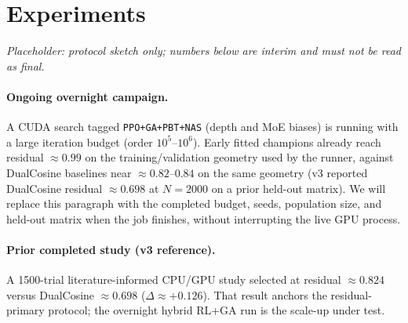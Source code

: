 \section{Experiments}
\label{sec:experiments}

\textit{Placeholder: protocol sketch only; numbers below are interim and must not be read as final.}

\paragraph{Ongoing overnight campaign.}
A CUDA search tagged \texttt{PPO+GA+PBT+NAS} (depth and MoE biases) is running with a large iteration budget (order $10^{5}$--$10^{6}$).
Early fitted champions already reach residual $\approx 0.99$ on the training/validation geometry used by the runner, against DualCosine baselines near $\approx 0.82$--$0.84$ on the same geometry (v3 reported DualCosine residual $\approx 0.698$ at $N{=}2000$ on a prior held-out matrix).
We will replace this paragraph with the completed budget, seeds, population size, and held-out matrix when the job finishes, without interrupting the live GPU process.

\paragraph{Prior completed study (v3 reference).}
A 1500-trial literature-informed CPU/GPU study selected  at residual $\approx 0.824$ versus DualCosine $\approx 0.698$ ($\Delta\approx +0.126$).
That result anchors the residual-primary protocol; the overnight hybrid RL+GA run is the scale-up under test.
